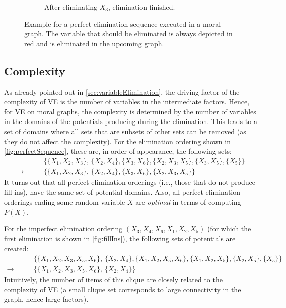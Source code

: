 \begin{figure}
\begin{subfigure}{0.49\linewidth}
				\caption{After eliminating \(X_3\), elimination finished.}
			\end{subfigure}
			\caption[Example for a Perfect Elimination Sequence]{Example for a perfect elimination sequence executed in a moral graph. The variable that should be eliminated is always depicted in {\color{TUDa-9b} red} and is eliminated in the upcoming graph.}
			\label{fig:perfectSequence}
		\end{figure}

		\subsection{Complexity}
			As already pointed out in \autoref{sec:variableElimination}, the driving factor of the complexity of VE is the number of variables in the intermediate factors. Hence, for VE on moral graphs, the complexity is determined by the number of variables in the domains of the potentials producing during the elimination. This leads to a set of domains where all sets that are subsets of other sets can be removed (as they do not affect the complexity). For the elimination ordering shown in \autoref{fig:perfectSequence}, these are, in order of appearance, the following sets:
			\begin{align}
				&\bigl\{ \{ X_1, X_2, X_3 \},\, \{ X_2, X_4 \}, \{ X_3, X_6 \}, \{ X_2, X_3, X_5 \}, \{ X_3, X_5 \}, \{ X_5 \} \bigr\} \\
				\longrightarrow\qquad
				&\bigl\{ \{ X_1, X_2, X_3 \},\, \{ X_2, X_4 \}, \{ X_3, X_6 \}, \{ X_2, X_3, X_5 \} \bigr\}
			\end{align}
			It turns out that all perfect elimination orderings (i.e., those that do not produce fill-ins), have the same set of potential domains. Also, all perfect elimination orderings ending some random variable \(X\) are \emph{optimal} in terms of computing \( P(X) \).

			For the imperfect elimination ordering \( (X_3, X_4, X_6, X_1, X_2, X_5) \) (for which the first elimination is shown in \autoref{fig:fillIns}), the following sets of potentials are created:
			\begin{align}
				&\bigl\{ \{ X_1, X_2, X_3, X_5, X_6 \},\, \{ X_2, X_4 \}, \{ X_1, X_2, X_5, X_6 \}, \{ X_1, X_2, X_5 \}, \{ X_2, X_5 \}, \{ X_5 \} \bigr\} \\
				\longrightarrow\qquad
				&\bigl\{ \{ X_1, X_2, X_3, X_5, X_6 \},\, \{ X_2, X_4 \} \bigr\}
			\end{align}
			Intuitively, the number of items of this clique are closely related to the complexity of VE (a small clique set corresponds to large connectivity in the graph, hence large factors).

